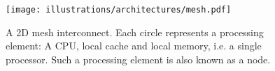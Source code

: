 \begin{figure}[htbp]
  \centering
  \texttt{[image: illustrations/architectures/mesh.pdf]}
  \caption{A 2D mesh interconnect. Each circle represents a processing element: A CPU, local cache and local memory, i.e. a single processor. Such a processing element is also known as a node.}
  \label{fig:mesh}
\end{figure}






